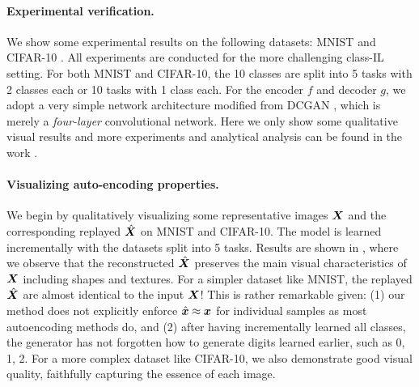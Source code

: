 \documentclass[../../book-main.tex]{subfiles}
\begin{document}
\paragraph{Experimental verification.}
We show some experimental results on the following datasets: MNIST \cite{lecun1998gradient} and CIFAR-10 \cite{krizhevsky2014cifar}. All experiments are conducted for the more challenging class-IL setting. For both MNIST and CIFAR-10, the 10 classes are split into 5 tasks with 2 classes each or 10 tasks with 1 class each. For the encoder $f$ and decoder $g$, we adopt a very simple network architecture modified from DCGAN \cite{radford2016unsupervised}, which is merely a {\em four-layer} convolutional network. Here we only show some qualitative visual results and more experiments and analytical analysis can be found in the work \cite{tong2023incremental}.

\paragraph{Visualizing auto-encoding properties.}
We begin by qualitatively visualizing some representative images $\bm{X}$ and the corresponding replayed $\hat{\bm{X}}$ on MNIST and CIFAR-10. The model is learned incrementally with the datasets split into 5 tasks. Results are shown in , where we observe that the reconstructed $\hat{\bm{X}}$ preserves the main visual characteristics of $\bm{X}$ including shapes and textures. For a simpler dataset like MNIST, the replayed $\hat{\bm{X}}$ are almost identical to the input $\bm{X}$! This is rather remarkable given: (1) our method does not explicitly enforce $\hat{\bm{x}} \approx \bm{x}$ for individual samples as most autoencoding methods do, and (2) after having incrementally learned all classes, the generator has not forgotten how to generate digits learned earlier, such as 0, 1, 2.  For a more complex dataset like CIFAR-10, we also demonstrate good visual quality, faithfully capturing the essence of each image.
\end{document}
